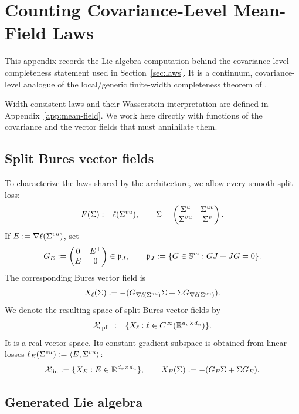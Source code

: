 
\section{Counting Covariance-Level Mean-Field Laws}
\label{app:law-counting}

This appendix records the Lie-algebra computation behind the covariance-level
completeness statement used in Section~\ref{sec:laws}.
It is a continuum, covariance-level analogue of the local/generic finite-width
completeness theorem of \citet{MarcotteGribonvalPeyre2023}.

Width-consistent laws and their Wasserstein interpretation are defined
in Appendix~\ref{app:mean-field}. We work here directly with functions
of the covariance and the vector fields that must annihilate them.

\subsection{Split Bures vector fields}
\label{subsec:split-bures-fields}

To characterize the laws shared by the architecture, we allow every
smooth split loss:
\[
F(\Sigma):=\ell(\Sigma^{vu}),
\qquad
\Sigma=
\begin{pmatrix}
\Sigma^u&\Sigma^{uv}\\
\Sigma^{vu}&\Sigma^v
\end{pmatrix}.
\]
If \(E:=\nabla \ell(\Sigma^{vu})\), set
\[
G_E:=
\begin{pmatrix}
0&E^\top\\
E&0
\end{pmatrix}\in\mathfrak p_J,
\qquad
\mathfrak p_J:=\{G\in\mathbb{S}^m:GJ+JG=0\}.
\]
The corresponding Bures vector field is
\begin{equation}
\label{eq:appendix-split-vector-field}
X_\ell(\Sigma):=-(G_{\nabla \ell(\Sigma^{vu})}\Sigma+\Sigma G_{\nabla \ell(\Sigma^{vu})}).
\end{equation}
We denote the resulting space of split Bures vector fields by
\[
\mathcal X_{\rm split}
:=
\{X_\ell:\ell\in C^\infty(\mathbb{R}^{d_v\times d_u})\}.
\]
It is a real vector space.  Its constant-gradient subspace is obtained from
linear losses \(\ell_E(\Sigma^{vu}):=\left\langle E,\Sigma^{vu} \right\rangle\):
\[
\mathcal X_{\rm lin}
:=
\{X_E:E\in\mathbb{R}^{d_v\times d_u}\},
\qquad
X_E(\Sigma):=-(G_E\Sigma+\Sigma G_E).
\]

\subsection{Generated Lie algebra}

